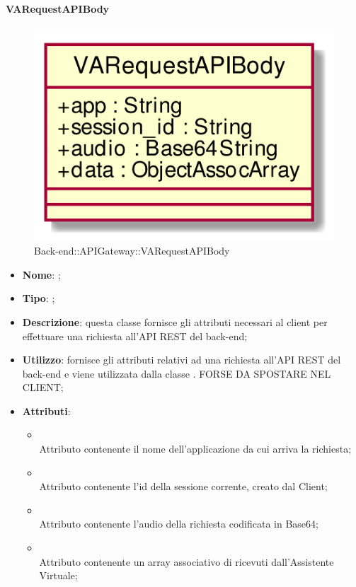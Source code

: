 \hypertarget{VARequestAPIBody_label}{\paragraph{VARequestAPIBody}}
\begin{figure}[h]
	\centering
	\includegraphics[width=\textwidth,height=\textheight,keepaspectratio]{images/ClassVARequestAPIBody.png}
	\caption{Back-end::APIGateway::VARequestAPIBody}
\end{figure}
\begin{itemize}
	\item \textbf{Nome}: ;
	\item \textbf{Tipo}: ;
	\item \textbf{Descrizione}: questa classe fornisce gli attributi necessari al client per effettuare una richiesta all'API REST del back-end;
	\item \textbf{Utilizzo}: fornisce gli attributi relativi ad una richiesta all'API REST del back-end e viene utilizzata dalla classe . FORSE DA SPOSTARE NEL CLIENT;
	\item \textbf{Attributi}:
	\begin{itemize}
		\item[]  \\
		Attributo contenente il nome dell'applicazione da cui arriva la richiesta;
		\item[]  \\
		Attributo contenente l'id della sessione corrente, creato dal Client;
		\item[]  \\
		Attributo contenente l'audio della richiesta codificata in Base64;
		\item[]  \\
		Attributo contenente un array associativo di  ricevuti dall'Assistente Virtuale;
	\end{itemize}
\end{itemize}
\FloatBarrier

